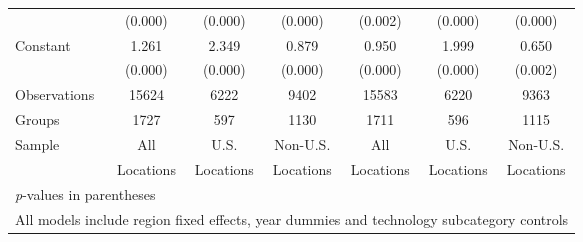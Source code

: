 \begin{table}[htbp]
\begin{tabular}{l*{6}{c}}
                &  (0.000)&  (0.000)&  (0.000)&  (0.002)&  (0.000)&  (0.000)\\
Constant        &    1.261&    2.349&    0.879&    0.950&    1.999&    0.650\\
                &  (0.000)&  (0.000)&  (0.000)&  (0.000)&  (0.000)&  (0.002)\\
\hline
Observations    &    15624&     6222&     9402&    15583&     6220&     9363\\
Groups          &     1727&      597&     1130&     1711&      596&     1115\\
Sample&All &U.S. &Non-U.S.&All &U.S. &Non-U.S. \\
          &Locations &Locations&Locations&Locations &Locations&Locations \\\hline\hline
\multicolumn{7}{l}{\footnotesize \textit{p}-values in parentheses}\\
\multicolumn{7}{l}{\footnotesize All models include region fixed effects, year dummies and technology subcategory controls}\\
\end{tabular}
\end{table}
